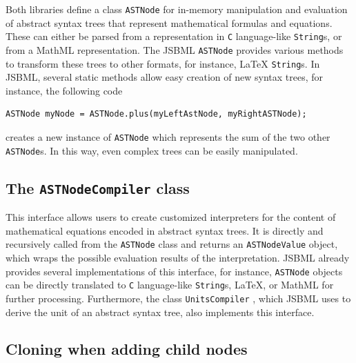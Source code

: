 \documentclass[
  BCOR12mm,
  letterpaper,
  11pt,
  headsepline,
  pointlessnumbers,
  tablecaptionabove,
  onelinecaption,
  headinclude,
  appendixprefix,
  idxtotoc,
  bibtotoc,
  twoside,
  titlepage
]{scrartcl}
\begin{document}
Both libraries define a class \texttt{ASTNode} for in-memory manipulation and
evaluation of abstract syntax trees that represent mathematical formulas and
equations. These can either be parsed from a representation in \texttt{C}
language-like \texttt{String}s, or from a MathML representation. The JSBML
\texttt{ASTNode} provides various methods to transform these trees to other
formats, for instance, \LaTeX{}\index{\LaTeX} \texttt{String}s. In JSBML, several static
methods allow easy creation of new syntax trees, for instance, the following
code
\begin{lstlisting}
ASTNode myNode = ASTNode.plus(myLeftAstNode, myRightASTNode);
\end{lstlisting}
creates a new instance of \texttt{ASTNode} which represents the sum of the two
other \texttt{ASTNode}s. In this way, even complex trees can be easily
manipulated.

\subsection{The \texttt{ASTNodeCompiler} class}

This interface allows users to create customized interpreters for the
content of mathematical equations encoded in abstract syntax trees. It
is directly and recursively called from the \texttt{ASTNode} class and returns
an \texttt{ASTNodeValue}
 object,
which wraps the possible evaluation results of the interpretation.
JSBML already provides several implementations of this
interface, for instance, \texttt{ASTNode} objects can be directly translated to
\texttt{C} language-like \texttt{String}s,
\LaTeX{}\index{\LaTeX}, or MathML for further processing.
Furthermore, the class \texttt{UnitsCompiler}
, which JSBML uses to derive the unit of an abstract syntax tree, also implements this interface.

\subsection{Cloning when adding child nodes}
\end{document}
